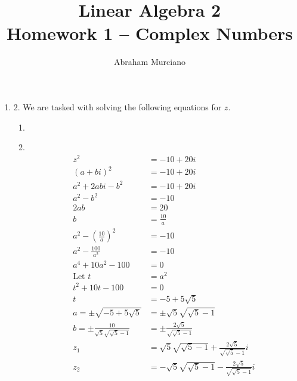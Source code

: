 \documentclass[fleqn]{article}
\title{Linear Algebra 2 \\
\medskip
\large Homework 1 -- Complex Numbers}
\author{Abraham Murciano}
\newenvironment{answers}{ %
	\begin{enumerate}
		\setlength{\itemsep}{\bigskipamount}
}{\end{enumerate}}
\newcommand\Item[1][]{ %
  \ifx\relax#1\relax  \item \else \item[#1] \fi
  \abovedisplayskip=0pt\abovedisplayshortskip=0pt~\vspace*{-\baselineskip}}
\begin{document}
\maketitle

\begin{answers}

	\item[2.]
		We are tasked with solving the following equations for \(z\).
		\begin{enumerate}
			\Item[(b)]
				\begin{align*}
					z^2                                            & = -10+20i \\
					(a + bi)^2                                     & = -10+20i \\
					a^2 + 2abi - b^2                               & = -10+20i \\
					a^2 -b^2                                       & = -10 \\
					2ab                                            & = 20 \\
					b                                              & = \frac{10}{a} \\
					a^2 -\left( \frac{10}{a} \right)^2             & = -10 \\
					a^2 - \frac{100}{a^2}                          & = -10 \\
					a^4 + 10a^2 - 100                              & = 0 \\
					\text{Let } t                                  & = a^2 \\
					t^2 + 10t - 100                                & = 0 \\
					t                                              & = -5 + 5 \sqrt{5} \\
					a = \pm\sqrt{-5+5\sqrt{5}}                     & = \pm\sqrt{5}\sqrt{\sqrt{5} - 1} \\
					b = \pm \frac{10}{\sqrt{5}\sqrt{\sqrt{5} - 1}} & = \pm \frac{2\sqrt{5}}{\sqrt{\sqrt{5} - 1}} \\
					z_1                                            & = \sqrt{5}\sqrt{\sqrt{5} - 1} + \frac{2\sqrt{5}}{\sqrt{\sqrt{5} - 1}}i \\
					z_2                                            & = -\sqrt{5}\sqrt{\sqrt{5} - 1} - \frac{2\sqrt{5}}{\sqrt{\sqrt{5} - 1}}i
				\end{align*}


\end{enumerate}
\end{answers}
\end{document}
